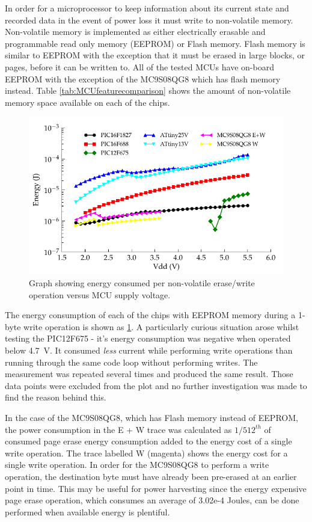       In order for a microprocessor to keep information about its current state and recorded data in the event of power loss it must write to non-volatile memory.
      Non-volatile memory is implemented as either electrically erasable and programmable read only memory (EEPROM) or Flash memory.
      Flash memory is similar to EEPROM with the exception that it must be erased in large blocks, or pages, before it can be written to.
      All of the tested MCUs have on-board EEPROM with the exception of the MC9S08QG8 which has flash memory instead.
      Table \ref{tab:MCUfeaturecomparison} shows the amount of non-volatile memory space available on each of the chips.

      \begin{figure}
        \centering
        \includegraphics{content/pt1/03-EnergyRequirements/graphics/Graph_All_EEPROM_JPO}
        \caption{\label{fig:Energy-consumed-EEPROM}Graph showing energy consumed per non-volatile erase/write operation versus MCU supply voltage.}
      \end{figure}

      The energy consumption of each of the chips with EEPROM memory during a 1-byte write operation is shown as \cref{fig:Energy-consumed-EEPROM}.
      A particularly curious situation arose whilst testing the PIC12F675 - it's energy consumption was negative when operated below \SI{4.7}{\volt}.
      It consumed \emph{less} current while performing write operations than running through the same code loop without performing writes.
      The measurement was repeated several times and produced the same result.
      Those data points were excluded from the plot and no further investigation was made to find the reason behind this.

      In the case of the MC9S08QG8, which has Flash memory instead of EEPROM, the power consumption in the E + W trace was calculated as $1/512^{th}$ of consumed page erase energy consumption added to the energy cost of a single write operation.
      The trace labelled W (magenta) shows the energy cost for a single write operation.
      In order for the MC9S08QG8 to perform a write operation, the destination byte must have already been pre-erased at an earlier point in time.
      This may be useful for power harvesting since the energy expensive page erase operation, which consumes an average of 3.02e-4 Joules, can be done performed when available energy is plentiful.

